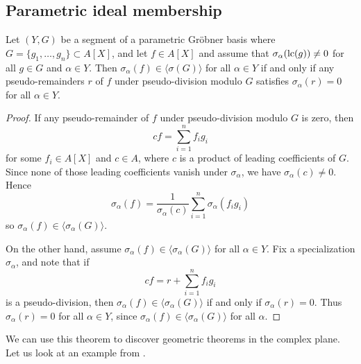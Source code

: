 \subsection{Parametric ideal membership}\label{sec:ps_div_app}


\begin{theorem}
  Let $(Y, G)$ be a segment of a parametric Gröbner basis where $G = \{g_{1}, \dots, g_{n}\} \subset A[X]$, and let $f \in A[X]$ and assume that $\sigma_{\alpha}(\operatorname{lc}(g)) \neq 0$ for all $g \in G$ and $\alpha \in Y$. Then $\sigma_{\alpha}(f) \in \langle \sigma(G) \rangle$ for all $\alpha \in Y$ if and only if any pseudo-remainders $r$ of $f$ under pseudo-division modulo $G$ satisfies $\sigma_{\alpha}(r) = 0$ for all $\alpha \in Y$.
\end{theorem}
\begin{proof}
  If any pseudo-remainder of $f$ under pseudo-division modulo $G$ is zero, then
  \[cf = \sum_{i=1}^{n} f_{i} g_{i}\]
  for some $f_{i} \in A[X]$ and $c \in A$, where $c$ is a product of leading coefficients of $G$. Since none of those leading coefficients vanish under $\sigma_{\alpha}$, we have $\sigma_{\alpha}(c) \neq 0$. Hence
  \[\sigma_{\alpha}(f) = \frac 1 {\sigma_{\alpha}(c)}\sum_{i=1}^{n} \sigma_{\alpha}(f_{i} g_{i})\]
  so $\sigma_{\alpha}(f) \in \langle \sigma_{\alpha}(G) \rangle$.

  On the other hand, assume $\sigma_{\alpha}(f) \in \langle \sigma_{\alpha}(G) \rangle$ for all $\alpha \in Y$. Fix a specialization $\sigma_{\alpha}$, and note that if
  \[cf = r + \sum_{i=1}^{n} f_{i} g_{i}\]
  is a pseudo-division, then $\sigma_{\alpha}(f) \in \langle \sigma_{\alpha}(G) \rangle$ if and only if $\sigma_{\alpha}(r) = 0$. Thus $\sigma_{\alpha}(r) = 0$ for all $\alpha \in Y$, since $\sigma_{\alpha}(f) \in \langle \sigma_{\alpha}(G) \rangle$ for all $\alpha$.
\end{proof}

We can use this theorem to discover geometric theorems in the complex plane. Let us look at an example from \cite{MONTES20101391}.



